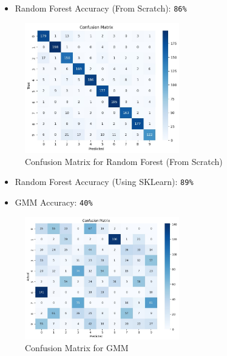 \documentclass[a4paper]{article}
\theoremstyle{plain}
\theoremstyle{definition}
\begin{document}
\begin{itemize}
    \item Random Forest Accuracy (From Scratch): \texttt{86\%}
\end{itemize}
\begin{figure}[H]
    \centering
    \includegraphics[width=0.6\textwidth]{rf_scratch_cm.png}
    \caption{Confusion Matrix for Random Forest (From Scratch)}
\end{figure}

\begin{itemize}
    \item Random Forest Accuracy (Using SKLearn): \texttt{89\%}
\end{itemize}

\begin{itemize}
    \item GMM Accuracy: \texttt{40\%}
\end{itemize}
\begin{figure}[H]
    \centering
    \includegraphics[width=0.6\textwidth]{gmm_cm.png}
    \caption{Confusion Matrix for GMM}
\end{figure}
\end{document}
